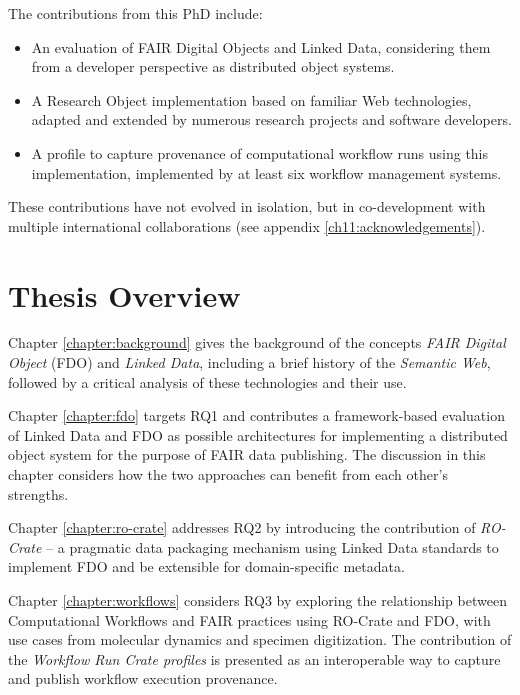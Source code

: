The contributions from this PhD include:

\begin{itemize}
    \item An evaluation of FAIR Digital Objects and Linked Data, considering them from a developer perspective as distributed object systems.
    \item A Research Object implementation based on familiar Web technologies, adapted and extended by numerous research projects and software developers.
    \item A profile to capture provenance of computational workflow runs using this implementation, implemented by at least six workflow management systems.
\end{itemize}

These contributions have not evolved in isolation, but in co-development with multiple international collaborations (see appendix \vref{ch11:acknowledgements}).


\section{Thesis Overview}
\label{intro:overview}

Chapter \vref{chapter:background} gives the background of the concepts \emph{FAIR Digital Object} (FDO) and \emph{Linked Data}, including a brief history of the \emph{Semantic Web}, followed by a critical analysis of these technologies and their use. 

Chapter \vref{chapter:fdo} targets RQ1 and contributes a framework-based evaluation of Linked Data and FDO as possible architectures for implementing a distributed object system for the purpose of FAIR data publishing. The discussion in this chapter considers how the two approaches can benefit from each other's strengths. 

Chapter \vref{chapter:ro-crate} addresses RQ2 by introducing the contribution of \emph{RO-Crate} -- a pragmatic data packaging mechanism using Linked Data standards to implement FDO and be extensible for domain-specific metadata.  

Chapter \vref{chapter:workflows} considers RQ3 by exploring the relationship between Computational Workflows and FAIR practices using RO-Crate and FDO, with use cases from molecular dynamics and specimen digitization. The contribution of the \emph{Workflow Run Crate profiles} is presented as an interoperable way to capture and publish workflow execution provenance. 

